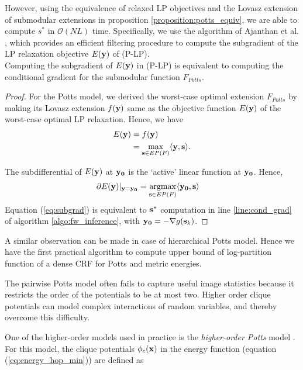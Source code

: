 However, using the equivalence of relaxed LP objectives and the Lovasz
extension of submodular extensions in proposition
\ref{proposition:potts_equiv}, we are able to compute $s^*$ in ${\mathcal
O}(NL)$ time. Specifically, we use the algorithm of
Ajanthan et al. \citep{ajanthan2017efficient}, which provides an efficient filtering procedure to compute the subgradient of the LP relaxation objective $E({\bf y})$ of (P-LP).\\
%
\vspace{-0.5cm}
{\proposition Computing the subgradient of $E({\bf y})$ in (P-LP) is equivalent to computing the conditional gradient for the submodular function $F_{Potts}$. \label{proposition:subgrad}} 
\begin{proof}
  For the Potts model, we derived the worst-case optimal extension $F_{Potts}$ by
  making its Lovasz extension $f({\bf y})$ same as the objective function
    $E({\bf y})$ of the worst-case optimal LP relaxation. Hence, we have
\begin{align}
    E({\bf y}) &= f({\bf y})  \nonumber \\
    {} &=  \max_{{\bf s} \in EP(F)} \langle {\bf y}, {\bf s} \rangle.\nonumber
\end{align}

The subdifferential of $E({\bf y})$ at $\bf y_0$ is the `active' linear function at $\bf y_0$. Hence,
\begin{align}
    \partial E({\bf y})|_{\bf y = y_0} &=  \argmax_{{\bf s} \in EP(F)} \langle {\bf y_0}, {\bf s} \rangle
    \label{eq:subgrad}
\end{align}
Equation (\ref{eq:subgrad}) is equivalent to ${\bf s}^*$ computation in line \ref{line:cond_grad} of algorithm \ref{algo:fw_inference}, with ${\bf y_0} = - \nabla g({\bf s}_k)$.
\end{proof}

A similar observation can be made in case of hierarchical Potts model. Hence we have the first practical algorithm to compute upper bound of log-partition function of a dense CRF for Potts and metric energies.

 The pairwise Potts model often fails
to capture useful image statistics because it restricts the order of the
potentials to be at most two. Higher order clique potentials can model complex
interactions of random variables, and thereby overcome this difficulty.

One of the higher-order models used in practice is the \textit{higher-order Potts} model \citep{kappes2016higher}. For this model, the clique potentials $\phi_c({\bf x})$ in 
the energy function (equation (\ref{eq:energy_hop_min})) are defined as

